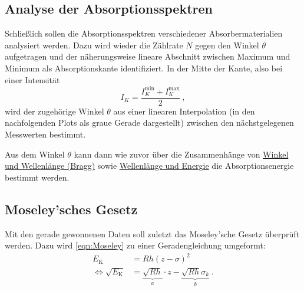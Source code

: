 \clearpage
\subsection{Analyse der Absorptionsspektren}
\label{sec:auswertung:absorptionsspektren}

Schließlich sollen die Absorptionsspektren verschiedener Absorbermaterialien analysiert werden.
Dazu wird wieder die Zählrate $N$ gegen den Winkel $\theta$ aufgetragen
und der näherungsweise lineare Abschnitt
zwischen Maximum und Minimum
als Absorptionskante identifiziert.
In der Mitte der Kante,
also bei einer Intensität
\[ I_K = \frac{I_K^\text{min} + I_K^\text{max}}{2} \ , \]
wird der zugehörige Winkel $\theta$
aus einer linearen Interpolation (in den nachfolgenden Plots als graue Gerade dargestellt)
zwischen den nächstgelegenen Messwerten bestimmt.

Aus dem Winkel $\theta$ kann dann wie zuvor
über die Zusammenhänge von
\hyperref[eqn:BraggBedingung]{Winkel und Wellenlänge (Bragg)} sowie
\hyperref[eqn:lambda_to_E]{Wellenlänge und Energie}
die Absorptionsenergie bestimmt werden.


\newpage
\subsection{Moseley'sches Gesetz}
\label{sec:auswertung:moseley}

Mit den gerade gewonnenen Daten soll zuletzt das Moseley'sche Gesetz überprüft werden.
Dazu wird \autoref{eqn:Moseley} zu einer Geradengleichung umgeformt:
\begin{align*}
    E_\text{K} &= R h (z - \sigma)^2 \\
    \Leftrightarrow
    \sqrt{E_\text{K}} &= \underbrace{\sqrt{R h}}_a \cdot z - \underbrace{\sqrt{R h} \sigma_k}_b \; .
\end{align*}

